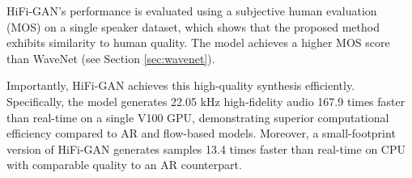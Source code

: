 HiFi-GAN's performance is evaluated using a subjective human evaluation (\ac{MOS}) on a single speaker dataset, which shows that the proposed method exhibits similarity to human quality. The model achieves a higher \ac{MOS} score than WaveNet (see Section \ref{sec:wavenet}).

Importantly, HiFi-GAN achieves this high-quality synthesis efficiently. Specifically, the model generates 22.05 kHz high-fidelity audio 167.9 times faster than real-time on a single V100 \ac{GPU}, demonstrating superior computational efficiency compared to AR and flow-based models. Moreover, a small-footprint version of HiFi-GAN generates samples 13.4 times faster than real-time on \ac{CPU} with comparable quality to an \ac{AR} counterpart.
